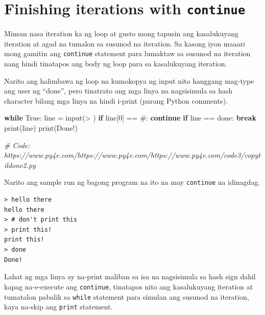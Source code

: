 \documentclass[10pt,]{book}
\newenvironment{Shaded}{}{}
\newcommand{\BuiltInTok}[1]{\textcolor[rgb]{0.00,0.50,0.00}{#1}}
\newcommand{\CommentTok}[1]{\textcolor[rgb]{0.38,0.63,0.69}{\textit{#1}}}
\newcommand{\ControlFlowTok}[1]{\textcolor[rgb]{0.00,0.44,0.13}{\textbf{#1}}}
\newcommand{\DecValTok}[1]{\textcolor[rgb]{0.25,0.63,0.44}{#1}}
\newcommand{\NormalTok}[1]{#1}
\newcommand{\OperatorTok}[1]{\textcolor[rgb]{0.40,0.40,0.40}{#1}}
\newcommand{\StringTok}[1]{\textcolor[rgb]{0.25,0.44,0.63}{#1}}
\newcommand{\VariableTok}[1]{\textcolor[rgb]{0.10,0.09,0.49}{#1}}
\begin{document}
\section{\texorpdfstring{Finishing iterations with
\texttt{continue}}{Finishing iterations with continue}}\label{finishing-iterations-with-continue}

 

Minsan nasa iteration ka ng loop at gusto mong tapusin ang kasalukuyang
iteration at agad na tumalon sa susunod na iteration. Sa kasong iyon
maaari mong gamitin ang \texttt{continue} statement para lumaktaw sa
susunod na iteration nang hindi tinatapos ang body ng loop para sa
kasalukuyang iteration.

Narito ang halimbawa ng loop na kumokopya ng input nito hanggang
mag-type ang user ng ``done'', pero tinatrato ang mga linya na
nagsisimula sa hash character bilang mga linya na hindi i-print (parang
Python comments).

\begin{Shaded}
\begin{Highlighting}[]
\ControlFlowTok{while} \VariableTok{True}\NormalTok{:}
\NormalTok{    line }\OperatorTok{=} \BuiltInTok{input}\NormalTok{(}\StringTok{\textquotesingle{}\textgreater{} \textquotesingle{}}\NormalTok{)}
    \ControlFlowTok{if}\NormalTok{ line[}\DecValTok{0}\NormalTok{] }\OperatorTok{==} \StringTok{\textquotesingle{}\#\textquotesingle{}}\NormalTok{:}
        \ControlFlowTok{continue}
    \ControlFlowTok{if}\NormalTok{ line }\OperatorTok{==} \StringTok{\textquotesingle{}done\textquotesingle{}}\NormalTok{:}
        \ControlFlowTok{break}
    \BuiltInTok{print}\NormalTok{(line)}
\BuiltInTok{print}\NormalTok{(}\StringTok{\textquotesingle{}Done!\textquotesingle{}}\NormalTok{)}

\CommentTok{\# Code: https://www.py4e.com/https://www.py4e.com/https://www.py4e.com/code3/copytildone2.py}
\end{Highlighting}
\end{Shaded}

Narito ang sample run ng bagong program na ito na may \texttt{continue}
na idinagdag.

{\small
\begin{verbatim}
> hello there
hello there
> # don't print this
> print this!
print this!
> done
Done!
\end{verbatim}
}

Lahat ng mga linya ay na-print maliban sa isa na nagsisimula sa hash
sign dahil kapag na-e-execute ang \texttt{continue}, tinatapos nito ang
kasalukuyang iteration at tumatalon pabalik sa \texttt{while} statement
para simulan ang susunod na iteration, kaya na-skip ang \texttt{print}
statement.
\end{document}
